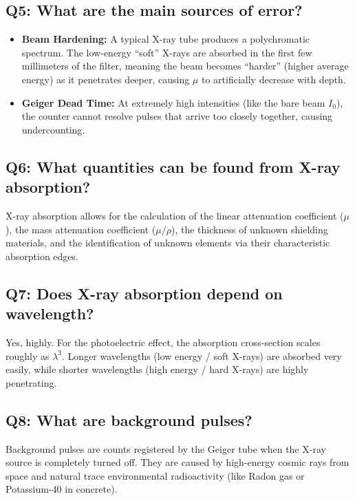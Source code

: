 \documentclass[a4paper,11pt]{article}
\begin{document}
\subsection*{Q5: What are the main sources of error?}
\begin{itemize}
    \item \textbf{Beam Hardening:} A typical X-ray tube produces a polychromatic spectrum. The low-energy ``soft'' X-rays are absorbed in the first few millimeters of the filter, meaning the beam becomes ``harder'' (higher average energy) as it penetrates deeper, causing $\mu$ to artificially decrease with depth.
    \item \textbf{Geiger Dead Time:} At extremely high intensities (like the bare beam $I_0$), the counter cannot resolve pulses that arrive too closely together, causing undercounting.
\end{itemize}

\subsection*{Q6: What quantities can be found from X-ray absorption?}
X-ray absorption allows for the calculation of the linear attenuation coefficient ($\mu$), the mass attenuation coefficient ($\mu/\rho$), the thickness of unknown shielding materials, and the identification of unknown elements via their characteristic absorption edges.

\subsection*{Q7: Does X-ray absorption depend on wavelength?}
Yes, highly. For the photoelectric effect, the absorption cross-section scales roughly as $\lambda^3$. Longer wavelengths (low energy / soft X-rays) are absorbed very easily, while shorter wavelengths (high energy / hard X-rays) are highly penetrating.

\subsection*{Q8: What are background pulses?}
Background pulses are counts registered by the Geiger tube when the X-ray source is completely turned off. They are caused by high-energy cosmic rays from space and natural trace environmental radioactivity (like Radon gas or Potassium-40 in concrete).
\end{document}
